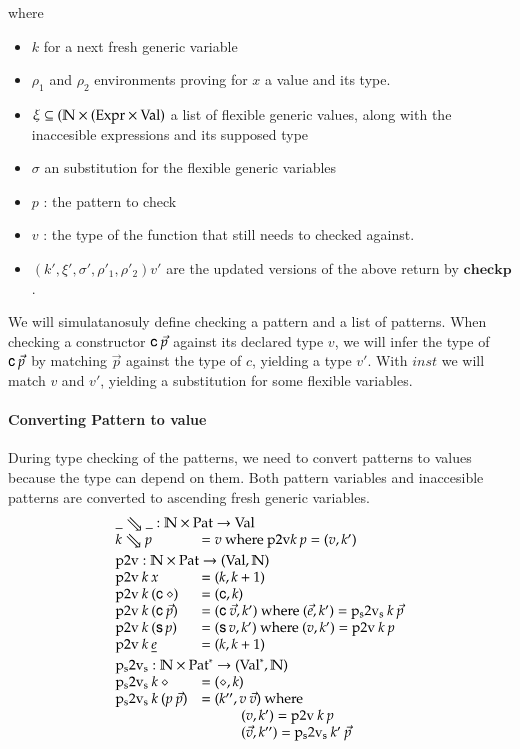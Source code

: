 where
\begin{itemize}
\item
$k$ for a next fresh generic variable
\item
$\rho_1$ and $\rho_2$ environments proving for $x$ a value and its type.
\item
$\xi \subseteq (\mathbb{N} \times (\mathrm{Expr} \times \mathrm{Val})$ a list of flexible generic values, along with the inaccesible expressions and its supposed type
\item
$\sigma$ an substitution for the flexible generic variables
\item
$p$ : the pattern to check
\item
$v$ : the type of the function that still needs to checked against.
\item
$(k',\xi',\sigma',\rho'_1,\rho'_2){v'}$ are the updated versions of the above return by $\mathbf{checkp}$.
\end{itemize}

We will simulatanosuly define checking a pattern and a list of patterns.
When checking a constructor $\mathsf{c} \: \vec{p}$ against its declared type $v$,
we will infer the type of $\mathsf{c} \: \vec{p}$ by matching $\vec{p}$ against the type of $c$,
yielding a type $v'$. With $inst$ we will match $v$ and $v'$, yielding a substitution for some flexible variables.

\paragraph*{Converting Pattern to value}
During type checking of the patterns, we need to convert patterns to values because the type can depend on them.
Both pattern variables and inaccesible patterns are converted to ascending fresh generic variables.
\[
\begin{array}{ll}

\multicolumn{2}{l}{\ptv{\_}{\_}: \cN \times \Pat \ra \Val}\\
\ptv{k}{p} & = v \mbox{ where } \ptvx k \: p = (v,k')
\vs\\ 
\multicolumn{2}{l}{\ptvx : \cN \times \Pat \ra (\Val,\cN)}\\
\ptvx \: k \:x & = (k,k+1) \\
\ptvx \: k \: (\cc \: \diamond) & = (\cc,k) \\
\ptvx \: k \: (\cc \: \vec{p}) & = (\cc \: \vec{v},k') \mbox{ where } (\vec{e},k') = \pstvs \: k \: \vec{p}\\
\ptvx \: k \: (\s p) & = (\s v,k') \mbox{ where } (v,k') = \ptvx \: k \: p\\
\ptvx \: k \: \inacc{e} & = (k,k+1) 
\vs\\
\multicolumn{2}{l}{\pstvs : \cN \times \ves{\Pat} \ra (\ves{\Val},\cN)}\\
\pstvs \: k \: \diamond & = (\diamond,k) \\
\pstvs \: k \: (p \: \vec{p}) & = (k'', v \: \vec{v}) \mbox{ where } \\
& \spcx (v,k') = \ptvx \: k \: p \\
& \spcx (\vec{v},k'') = \pstvs \: k' \: \vec{p}  
\end{array}
\]

